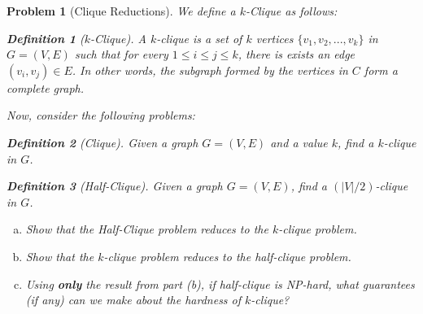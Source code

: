 \documentclass[10pt]{article}
\newtheorem{problem}{\sc\color{cit}Problem}
\newtheorem{definition}{Definition}
\begin{document}
\begin{problem}[Clique Reductions]

We define a $k$-Clique as follows:
\begin{definition}[$k$-Clique]
A $k$-clique is a set of $k$ vertices $\{v_1, v_2, ..., v_k\}$ in $G = (V, E)$ such that for every $1 \leq i \leq j \leq k$, there is exists an edge $(v_i, v_j) \in E$. In other words, the subgraph formed by the vertices in $C$ form a complete graph. 
\end{definition}

Now, consider the following problems:
\begin{definition}[Clique]
Given a graph $G=(V, E)$ and a value $k$, find a $k$-clique in $G$.
\end{definition}

\begin{definition}[Half-Clique]
Given a graph $G=(V, E)$, find a $(|V|/2)$-clique in $G$.
\end{definition}

\begin{enumerate}[(a)]
    \item Show that the Half-Clique problem reduces to the $k$-clique problem.
    \item Show that the $k$-clique problem reduces to the half-clique problem. 
    \item Using \textbf{only} the result from part (b), if half-clique is NP-hard, what guarantees (if any) can we make about the hardness of $k$-clique?
\end{enumerate}

\end{problem}

\begin{solution}

\end{solution}
\end{document}
